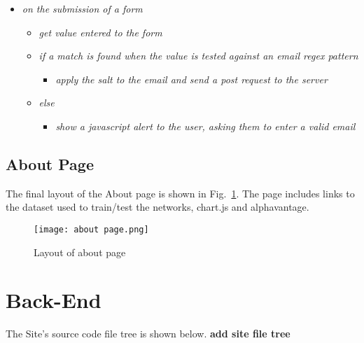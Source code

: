             \begin{itemize}
                \item \textit{on the submission of a form}
                \begin{itemize}
                    \item \textit{get value entered to the form}
                    \item \textit{if a match is found when the value is tested against an email regex pattern}
                    \begin{itemize}
                        \item \textit{apply the salt to the email and send a post request to the server}
                    \end{itemize}
                    \item \textit{else}
                    \begin{itemize}
                        \item \textit{show a javascript alert to the user, asking them to enter a valid email}
                    \end{itemize}
                \end{itemize}
            \end{itemize}

        \subsection{About Page}

        The final layout of the About page is shown in Fig.~\ref{fig:about_page}. The page includes links to the dataset used to train/test the networks, chart.js and alphavantage.

            \begin{figure}[h]
                \centering
                \texttt{[image: about page.png]}
                \caption{Layout of about page}
                \label{fig:about_page}
            \end{figure}

    \section{Back-End}

        The Site's source code file tree is shown below. \textbf{add site file tree}

